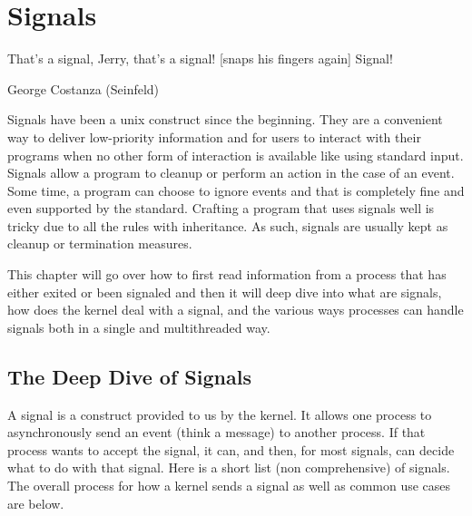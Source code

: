 \chapter{Signals}

\epigraph{That's a signal, Jerry, that's a signal! [snaps his fingers again] Signal!}{George Costanza (Seinfeld)}

Signals have been a unix construct since the beginning. They are a convenient way to deliver low-priority information and for users to interact with their programs when no other form of interaction is available like using standard input. Signals allow a program to cleanup or perform an action in the case of an event. Some time, a program can choose to ignore events and that is completely fine and even supported by the standard. Crafting a program that uses signals well is tricky due to all the rules with inheritance. As such, signals are usually kept as cleanup or termination measures.

This chapter will go over how to first read information from a process that has either exited or been signaled and then it will deep dive into what are signals, how does the kernel deal with a signal, and the various ways processes can handle signals both in a single and multithreaded way.

\section{The Deep Dive of Signals}

A signal is a construct provided to us by the kernel. It allows one process to asynchronously send an event (think a message) to another process. If that process wants to accept the signal, it can, and then, for most signals, can decide what to do with that signal. Here is a short list (non comprehensive) of signals. The overall process for how a kernel sends a signal as well as common use cases are below.

